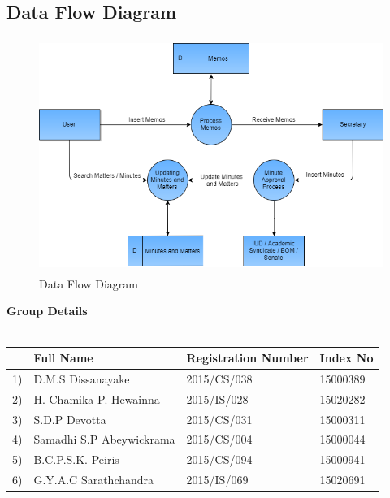 \documentclass[a4paper,beamer]{article}
\begin{document}
	\subsection{Data Flow Diagram}
		\vspace{2cm}
		\begin{figure}[h]
			\begin{center}
				\includegraphics[width=5in,height=3in]{img/data-flow-diagram}
			\end{center}
			\caption{Data Flow Diagram}
			\label{fig:dataflow}
		\end{figure}
		\newpage
	
		\textbf{Group Details}\\
		\vspace{1cm}\\	
				\bgroup
					\def\arraystretch{2}%
					\begin{tabular}{|p{.5cm}|p{5cm}|p{4cm}|p{3cm}|} \hline 
					  & \textbf{Full Name}  & \textbf{Registration Number} & \textbf{Index No } \\ \hline
					1) & D.M.S Dissanayake	 & 2015/CS/038 & 15000389\\ \hline
					2) & H. Chamika  P.  Hewainna & 2015/IS/028 & 15020282\\ \hline
					3) & S.D.P Devotta & 2015/CS/031 & 15000311\\ \hline
					4) & Samadhi S.P Abeywickrama & 2015/CS/004 & 15000044\\ \hline
					5) & B.C.P.S.K. Peiris	 & 2015/CS/094 & 15000941\\ \hline
					6) & G.Y.A.C Sarathchandra & 2015/IS/069 & 15020691\\ \hline
					\end{tabular} \\[.6cm]
				\egroup
	
\end{document}
